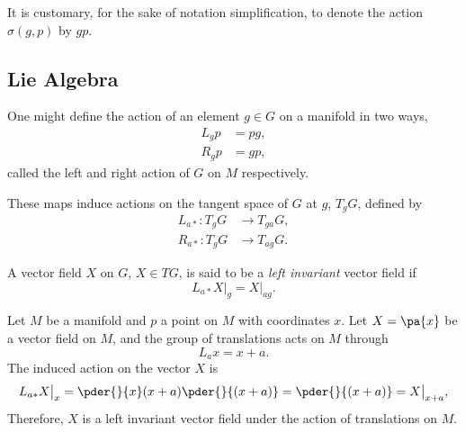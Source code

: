 It is customary, for the sake of notation simplification, to denote the action $\sigma(g, p)$ by $g p$.


\subsection{Lie Algebra}

One might define the action of an element $g \in G$ on a manifold in two ways,
\begin{equation}
  \begin{split}
    L_g p &= p g, \\
    R_g p &= g p,
  \end{split}
\end{equation}
called the left and right action of $G$ on $M$ respectively.

These maps induce actions on the tangent space of $G$ at $g$, $T_g G$, defined by
\begin{equation}
  \begin{split}
    L_{a*} : T_g G &\to T_{ga} G, \\
    R_{a*} : T_g G &\to T_{ag} G.
  \end{split}
\end{equation}

\begin{Def}
  A vector field $X$ on $G$, $X \in TG$, is said to be a \emph{left invariant} vector field if
  \begin{equation}
    L_{a*} X \bigr|_{g} = X \bigr|_{ag}.
  \end{equation}
\end{Def}

\begin{WEbox}[%
    frametitle={Left Invariant Vector Field},
    frametitlerule=true,
    frametitlealignment=\centering,
    frametitleaboveskip=10pt,]
  Let $M$ be a manifold and $p$ a point on $M$ with coordinates $x$. Let $X = \pa{x}$ be a vector field on $M$, and the group of translations acts on $M$ through 
  \begin{equation}
    L_a x = x + a.
  \end{equation}
  The induced action on the vector $X$ is
  \begin{equation}
    L_{a*} X \bigr|_x = \pder{}{x}(x + a) \pder{}{(x + a)} = \pder{}{(x + a)} = X \bigr|_{x+a},
  \end{equation}
  Therefore, $X$ is a left invariant vector field under the action of translations on $M$.
\end{WEbox}

